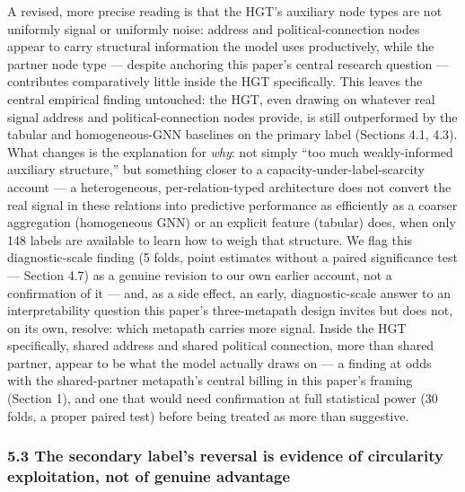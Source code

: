 \documentclass[11pt,]{article}
\begin{document}
A revised, more precise reading is that the HGT's auxiliary node types
are not uniformly signal or uniformly noise: address and
political-connection nodes appear to carry structural information the
model uses productively, while the partner node type --- despite
anchoring this paper's central research question --- contributes
comparatively little inside the HGT specifically. This leaves the
central empirical finding untouched: the HGT, even drawing on whatever
real signal address and political-connection nodes provide, is still
outperformed by the tabular and homogeneous-GNN baselines on the primary
label (Sections 4.1, 4.3). What changes is the explanation for
\emph{why}: not simply ``too much weakly-informed auxiliary structure,''
but something closer to a capacity-under-label-scarcity account --- a
heterogeneous, per-relation-typed architecture does not convert the real
signal in these relations into predictive performance as efficiently as
a coarser aggregation (homogeneous GNN) or an explicit feature (tabular)
does, when only 148 labels are available to learn how to weigh that
structure. We flag this diagnostic-scale finding (5 folds, point
estimates without a paired significance test --- Section 4.7) as a
genuine revision to our own earlier account, not a confirmation of it
--- and, as a side effect, an early, diagnostic-scale answer to an
interpretability question this paper's three-metapath design invites but
does not, on its own, resolve: which metapath carries more signal.
Inside the HGT specifically, shared address and shared political
connection, more than shared partner, appear to be what the model
actually draws on --- a finding at odds with the shared-partner
metapath's central billing in this paper's framing (Section 1), and one
that would need confirmation at full statistical power (30 folds, a
proper paired test) before being treated as more than suggestive.

\hypertarget{the-secondary-labels-reversal-is-evidence-of-circularity-exploitation-not-of-genuine-advantage}{%
\subsubsection{5.3 The secondary label's reversal is evidence of
circularity exploitation, not of genuine
advantage}\label{the-secondary-labels-reversal-is-evidence-of-circularity-exploitation-not-of-genuine-advantage}}
\end{document}
